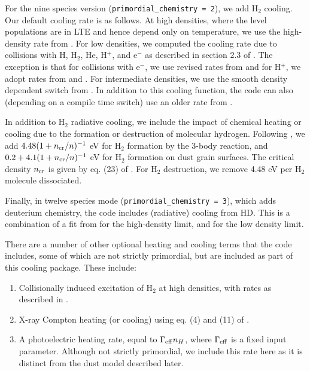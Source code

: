 For the nine species version (\texttt{primordial\_chemistry = 2}), we add H$_2$ cooling.  Our default cooling rate is as follows.  At high densities, where the level populations are in LTE and hence depend only on temperature, we use the high-density rate from \citet{1998A&A...335..403G}. For low densities, we computed the cooling rate due to collisions with H, H$_2$, He, H$^+$, and e$^-$ as described in section 2.3 of  \citet{2008MNRAS.388.1627G}.  The exception is that for collisions with e$^-$, we use revised rates from \citet{yoon2008cross} and for H$^+$, we adopt rates from \citet{2011PhRvL.107b3201H} and \citet{2012PhRvL.108j9903H}.  For intermediate densities, we use the smooth density dependent switch from \citet{1998A&A...335..403G}.  In addition to this cooling function, the code can also (depending on a compile time switch) use an older rate from \citet{1984ApJ...280..465L}.

\label{sec:chemheat}

In addition to H$_2$ radiative cooling, we include the impact of chemical heating or cooling due to the formation or destruction of molecular hydrogen.  Following \citet{2000ApJ...534..809O}, we add $4.48 (1 + n_{\rm cr}/n)^{-1}$ eV for H$_2$ formation by the 3-body reaction, and $0.2 + 4.1(1 + n_{\rm cr}/n)^{-1}$ eV for H$_2$ formation on dust grain surfaces.  The critical density $n_{\rm cr}$ is given by eq. (23) of  \citet{2000ApJ...534..809O}.  For H$_2$ destruction, we remove 4.48 eV per H$_2$ molecule dissociated.

Finally, in twelve species mode (\texttt{primordial\_chemistry = 3}), which adds deuterium chemistry, the code includes (radiative) cooling from HD.  This is a combination of a fit from \citet{2011MNRAS.415..487C} for the high-density limit, and \citet{2007MNRAS.382..133W} for the low density limit.

There are a number of other optional heating and cooling terms that the code includes, some of which are not strictly primordial, but are included as part of this cooling package.  These include:  
\begin{enumerate}
\item Collisionally induced excitation of H$_2$ at high densities, with rates as described in \citet{2004MNRAS.348.1019R}.
\item X-ray Compton heating (or cooling) using eq. (4) and (11) of \citet{1999ApJ...517L...9M}.
\item A photoelectric heating rate, equal to $\Gamma_{\rm eff} n_H$, where $\Gamma_{\rm eff}$ is a fixed input parameter.  Although not strictly primordial, we include this rate here as it is distinct from the dust model described later.
\end{enumerate}


